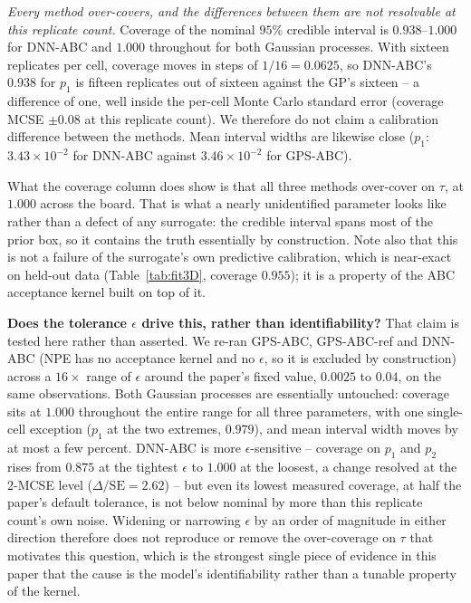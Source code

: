\documentclass[sn-basic,iicol,pdflatex]{sn-jnl}
\begin{document}
\emph{Every method over-covers, and the differences between them are not
resolvable at this replicate count.} Coverage of the nominal $95\%$ credible
interval is $0.938$--$1.000$ for DNN-ABC and $1.000$ throughout for both
Gaussian processes. With sixteen replicates per cell, coverage moves in steps of
$1/16 = 0.0625$, so DNN-ABC's $0.938$ for $p_1$ is fifteen replicates out of
sixteen against the GP's sixteen -- a difference of one, well inside the
per-cell Monte Carlo standard error (coverage MCSE $\pm 0.08$ at this replicate
count). We therefore do not claim a calibration difference between the methods. Mean interval widths are likewise close
($p_1$: $3.43\times10^{-2}$ for DNN-ABC against $3.46\times10^{-2}$ for
GPS-ABC).

What the coverage column does show is that all three methods over-cover on
$\tau$, at $1.000$ across the board. That is what a nearly unidentified
parameter looks like rather than a defect of any surrogate: the credible
interval spans most of the prior box, so it contains the truth essentially by
construction. Note also that this is not a failure of the surrogate's own
predictive calibration, which is near-exact on held-out data
(Table~\ref{tab:fit3D}, coverage $0.955$); it is a property of the ABC
acceptance kernel built on top of it.

\noindent\textbf{Does the tolerance $\epsilon$ drive this, rather than
identifiability?} That claim is tested here rather than asserted. We re-ran
GPS-ABC, GPS-ABC-ref and DNN-ABC (NPE has no acceptance kernel and no
$\epsilon$, so it is excluded by construction) across a $16\times$ range of
$\epsilon$ around the paper's fixed value, $0.0025$ to $0.04$, on the same
observations. Both Gaussian processes are essentially untouched: coverage
sits at $1.000$ throughout the entire range for all three parameters, with
one single-cell exception ($p_1$ at the two extremes, $0.979$), and mean
interval width moves by at most a few percent. DNN-ABC is more
$\epsilon$-sensitive -- coverage on $p_1$ and $p_2$ rises from $0.875$ at the
tightest $\epsilon$ to $1.000$ at the loosest, a change resolved at the
$2$-MCSE level ($\Delta/\mathrm{SE}=2.62$) -- but even its lowest measured
coverage, at half the paper's default tolerance, is not below nominal by
more than this replicate count's own noise. Widening or narrowing $\epsilon$
by an order of magnitude in either direction therefore does not reproduce or
remove the over-coverage on $\tau$ that motivates this question, which is
the strongest single piece of evidence in this paper that the cause is the
model's identifiability rather than a tunable property of the kernel.
\end{document}
